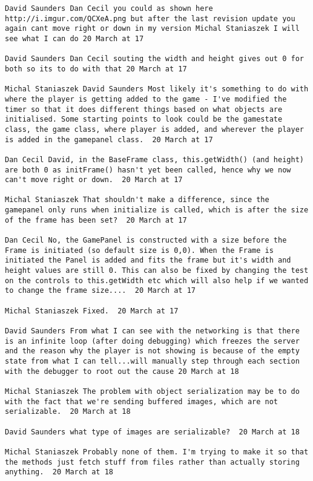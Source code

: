 \begin{verbatim}
David Saunders ‎Dan Cecil you could as shown here
http://i.imgur.com/QCXeA.png but after the last revision update you
again cant move right or down in my version Michal Staniaszek I will
see what I can do 20 March at 17

David Saunders ‎Dan Cecil souting the width and height gives out 0 for
both so its to do with that 20 March at 17

Michal Staniaszek ‎David Saunders Most likely it's something to do with
where the player is getting added to the game - I've modified the
timer so that it does different things based on what objects are
initialised. Some starting points to look could be the gamestate
class, the game class, where player is added, and wherever the player
is added in the gamepanel class.  20 March at 17

Dan Cecil David, in the BaseFrame class, this.getWidth() (and height)
are both 0 as initFrame() hasn't yet been called, hence why we now
can't move right or down.  20 March at 17

Michal Staniaszek That shouldn't make a difference, since the
gamepanel only runs when initialize is called, which is after the size
of the frame has been set?  20 March at 17

Dan Cecil No, the GamePanel is constructed with a size before the
Frame is initiated (so default size is 0,0). When the Frame is
initiated the Panel is added and fits the frame but it's width and
height values are still 0. This can also be fixed by changing the test
on the controls to this.getWidth etc which will also help if we wanted
to change the frame size....  20 March at 17

Michal Staniaszek Fixed.  20 March at 17

David Saunders From what I can see with the networking is that there
is an infinite loop (after doing debugging) which freezes the server
and the reason why the player is not showing is because of the empty
state from what I can tell...will manually step through each section
with the debugger to root out the cause 20 March at 18

Michal Staniaszek The problem with object serialization may be to do
with the fact that we're sending buffered images, which are not
serializable.  20 March at 18

David Saunders what type of images are serializable?  20 March at 18

Michal Staniaszek Probably none of them. I'm trying to make it so that
the methods just fetch stuff from files rather than actually storing
anything.  20 March at 18


\end{verbatim}
